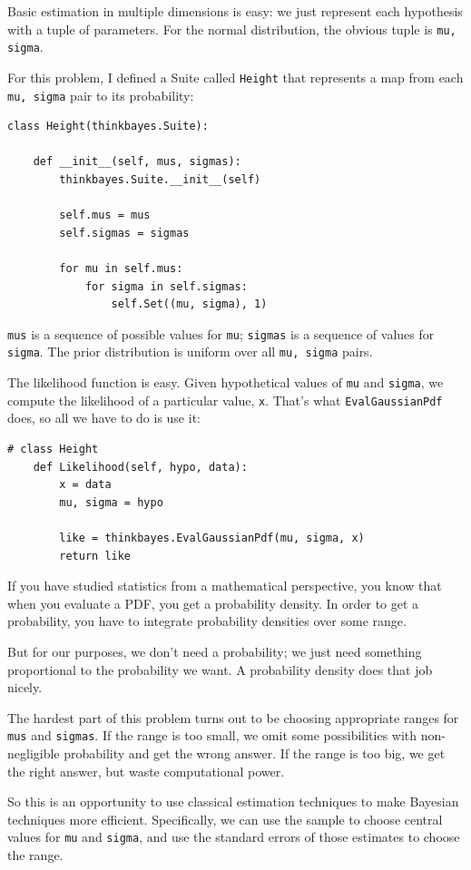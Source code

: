\documentclass[12pt]{book}
\begin{document}
Basic estimation in multiple dimensions is easy: we just represent
each hypothesis with a tuple of parameters.  For the normal
distribution, the obvious tuple is {\tt mu, sigma}.

For this problem, I defined a Suite called {\tt Height} that represents
a map from each {\tt mu, sigma} pair to its probability:

\begin{verbatim}
class Height(thinkbayes.Suite):

    def __init__(self, mus, sigmas):
        thinkbayes.Suite.__init__(self)

        self.mus = mus
        self.sigmas = sigmas

        for mu in self.mus:
            for sigma in self.sigmas:
                self.Set((mu, sigma), 1)
\end{verbatim}

{\tt mus} is a sequence of possible values for {\tt mu}; {\tt sigmas}
is a sequence of values for {\tt sigma}.  The prior distribution
is uniform over all {\tt mu, sigma} pairs.

The likelihood function is easy.  Given hypothetical values
of {\tt mu} and {\tt sigma}, we compute the likelihood
of a particular value, {\tt x}.  That's what {\tt EvalGaussianPdf}
does, so all we have to do is use it:

\begin{verbatim}
# class Height
    def Likelihood(self, hypo, data):
        x = data
        mu, sigma = hypo

        like = thinkbayes.EvalGaussianPdf(mu, sigma, x)
        return like
\end{verbatim}

If you have studied statistics from a mathematical perspective,
you know that when you evaluate a PDF, you get a probability
density.  In order to get a probability, you have to integrate
probability densities over some range.

But for our purposes, we don't need a probability; we just
need something proportional to the probability we want.
A probability density does that job nicely.

The hardest part of this problem turns
out to be choosing appropriate ranges for {\tt mus} and
{\tt sigmas}.  If the range is too small, we omit some
possibilities with non-negligible probability and get the
wrong answer.  If the range is too big, we get the right answer,
but waste computational power.

So this is an opportunity to use classical estimation techniques to
make Bayesian techniques more efficient.  Specifically, we can use the
sample to choose central values for {\tt mu} and {\tt sigma}, and use
the standard errors of those estimates to choose the range.
\end{document}
